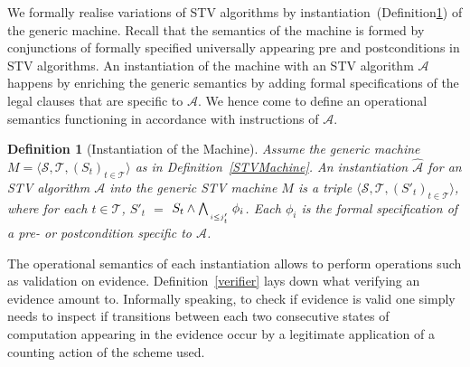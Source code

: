 \documentclass[10pt,conference]{IEEEtran}
\newtheorem{definition}{Definition}
\begin{document}
We formally realise variations of STV algorithms by instantiation~(Definition\ref{STVInst}) of the generic machine. Recall that the semantics of the machine is formed by conjunctions of formally specified universally appearing pre and postconditions in STV algorithms. An instantiation of the machine with an STV algorithm $\mathcal{A}$ happens by enriching the generic semantics by adding formal specifications of the legal clauses that are specific to $\mathcal{A}$. We hence come to define an operational semantics functioning in accordance with instructions of $\mathcal{A}$. 
\begin{definition}[Instantiation of the Machine]\label{STVInst}
Assume the generic machine $M = \langle \mathcal{S}, \mathcal{T}, (S_t)_{t \in \mathcal{T}} \rangle$ as in Definition~\ref{STVMachine}. An instantiation $\hat{\mathcal{A}}$ for an STV algorithm $\mathcal{A}$ into the generic STV machine $M$ is a triple $\langle \mathcal{S}, \mathcal{T}, (S'_t)_{t \in \mathcal{T}} \rangle$, where for each $t\in\mathcal{T}$, $S'_{t}$ $=$ $S_{t}\wedge\bigwedge_{\atop{i\leq j'_{t}}} \phi_{i}$. Each $\phi_{i}$ is the formal specification of a pre- or postcondition specific to $\mathcal{A}$.   
\end{definition}

The operational semantics of each instantiation allows  to perform operations such as validation on evidence. Definition~\ref{verifier} lays down what verifying an evidence amount to. Informally speaking, to check if  evidence is valid one simply needs to inspect if transitions  between each two consecutive states of computation appearing in the evidence occur by a legitimate application of a counting action of the scheme used.
\end{document}
